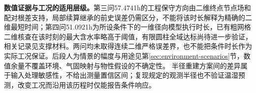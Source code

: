 \textbf{数值证据与工况的适用层级。}第三问57.4741\unit{h}的工程保守方向由二维终点节点场和配对根差支持，局部续算继承的前史误差仍需区分，不能将该时长解释为精确的二维最短时间；第四问51.0921\unit{h}为所设条件下的一维径向模型执行时长，已有粗网格二维核查在该时刻的最大含水率略高于阈值，有限圆柱全域达标尚待进一步验证，相关记录见支撑材料。两问均未取得连续二维严格误差界，也不能把条件时长作为实际工况保证。后段人为情景的幅度与用途见第\ref{sec:environment-scenarios}节，数值余量不覆盖环境、气固映射与物性假设的不确定性。
半径重建方案间的差异属于输入处理敏感性，不给出测量置信区间；复现规定的观测半径也不验证温湿预测，改变工况而沿用该历程时仅能报告条件响应。
\par\endgroup
